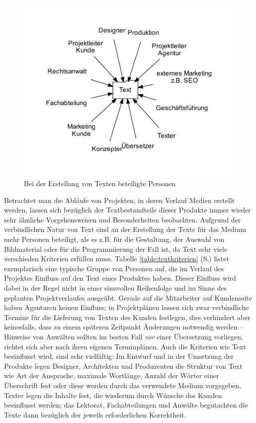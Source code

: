 \begin{figure}[htb]
\begin{center}
\includegraphics[width=\textwidth]{media/chart-2.pdf}
\end{center}
\caption{Bei der Erstellung von Texten beteiligte Personen}
\label{chart:2}
\end{figure}

Betrachtet man die Abläufe von Projekten, in deren Verlauf Medien erstellt werden, lassen sich bezüglich der Textbestandteile dieser Produkte immer wieder sehr ähnliche Vorgehensweisen und Besonderheiten beobachten. Aufgrund der verbindlichen Natur von Text sind an der Erstellung der Texte für das Medium mehr Personen beteiligt, als es z.B. für die Gestaltung, der Auswahl von Bildmaterial oder für die Programmierung der Fall ist,  da Text sehr viele verschieden Kriterien erfüllen muss. Tabelle \ref{table:textkriterien} (S.\pageref{table:textkriterien}) listet exemplarisch eine typische Gruppe von Personen auf, die im Verlauf des Projektes Einfluss auf den Text eines Produktes haben. Dieser Einfluss wird dabei in der Regel nicht in einer sinnvollen Reihenfolge und im Sinne des geplanten Projektverlaufes ausgeübt. Gerade auf die Mitarbeiter auf Kundenseite haben Agenturen keinen Einfluss; in Projektplänen lassen sich zwar verbindliche Termine für die Lieferung von Texten des Kunden festlegen, dies verhindert aber keinesfalls, dass zu einem späteren Zeitpunkt Änderungen notwendig werden -- Hinweise von Anwälten sollten im besten Fall \emph{vor} einer Übersetzung vorliegen, richtet sich aber nach ihren eigenen Terminplänen. Auch die Kriterien wie Text beeinflusst wird, sind sehr vielfältig: Im Entwurf und in der Umsetzung der Produkte legen Designer, Architekten und Produzenten die Struktur von Text wie Art der Ansprache, maximale Wortlänge, Anzahl der Wörter einer Überschrift fest oder diese werden durch das verwendete Medium vorgegeben, Texter legen die Inhalte fest, die wiederum durch Wünsche des Kunden beeinflusst werden; das Lektorat, Fachabteilungen und Anwälte begutachten die Texte dann bezüglich der jeweils erforderlichen Korrektheit.

